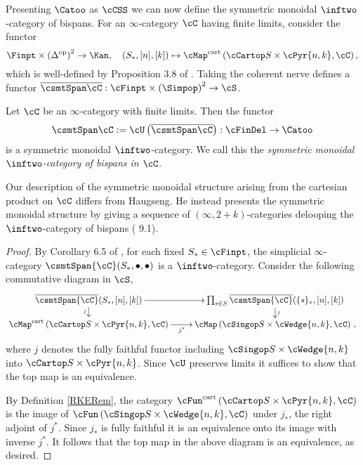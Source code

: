 \documentclass[a4paper]{article}
\numberwithin{equation}{section}
\begin{document}
 
Presenting $\Catoo$ as $\cCSS$ we can now define the symmetric monoidal $\inftwo$-category of bispans. For an $\infty$-category $\cC$ having finite limits, consider the functor
\begin{equation*}
 \Finpt\times \left(\Delta^{\rm op}\right)^2 \to \Kan, \quad (S_*, [n],[k]) \mapsto \cMap^{\rm cart}\left(\cCartop S \times \cPyr {n,k}, \cC \right),
\end{equation*}
which is well-defined by Proposition 3.8 of \cite{RuneSpans}. Taking the coherent nerve defines a functor $\overline{\csmtSpan \cC}:\cFinpt \times \left(\Simpop\right)^2 \to \cS$.

\begin{prop}
 Let $\cC$ be an $\infty$-category with finite limits. Then the functor 
 \begin{equation*}
 \csmtSpan \cC:=\cU \left(\overline{\csmtSpan \cC}\right): \cFinDel \to \Catoo
 \end{equation*}
 is a symmetric monoidal $\inftwo$-category. We call this the {\em symmetric monoidal $\inftwo$-category of bispans in $\cC$}.
\end{prop}
\begin{remark}
 Our description of the symmetric monoidal structure arising from the cartesian product on $\cC$ differs from Haugseng. He instead presents the symmetric monoidal structure by giving a sequence of $(\infty,2+k)$-categories delooping the $\inftwo$-category of bispans (\cite{RuneSpans} 9.1).
\end{remark}

\begin{proof}
 By Corollary 6.5 of \cite{RuneSpans}, for each fixed $S_* \in \cFinpt$, the simplicial $\infty$-category $\csmtSpan {\cC}(S_*, \bullet, \bullet)$ is a $\inftwo$-category. Consider the following commutative diagram in $\cS$,
 \begin{equation*}
  \xymatrixrowsep{.8pc}\xymatrix{\overline{\csmtSpan {\cC}}(S_*,[n],[k]) \ar[d]_-{\wr} \ar[r] & \prod_{s \in S} \overline{\csmtSpan {\cC}}(\{s\}_*,[n],[k]) \ar[d]^-{\wr} \\
  \cMap^{\rm cart}\left(\cCartop S \times \cPyr {n,k}, \cC \right) \ar[r]_{j^*} & \cMap\left(\cSingop S \times \cWedge {n,k}, \cC \right) \, ,}
 \end{equation*}
 where $j$ denotes the fully faithful functor including $\cSingop S \times \cWedge{n,k}$ into $\cCartop S \times \cPyr{n,k}$. Since $\cU$ preserves limits it suffices to show that the top map is an equivalence. 
 
 By Definition \ref{RKERem}, the category $\cFun^{\rm cart}\left(\cCartop S \times \cPyr {n,k}, \cC \right)$ is the image of $\cFun\left(\cSingop S \times \cWedge {n,k}, \cC \right)$ under $j_*$, the right adjoint of $j^*$. Since $j_*$ is fully faithful it is an equivalence onto its image with inverse $j^*$. It follows that the top map in the above diagram is an equivalence, as desired.
\end{proof}
\end{document}
